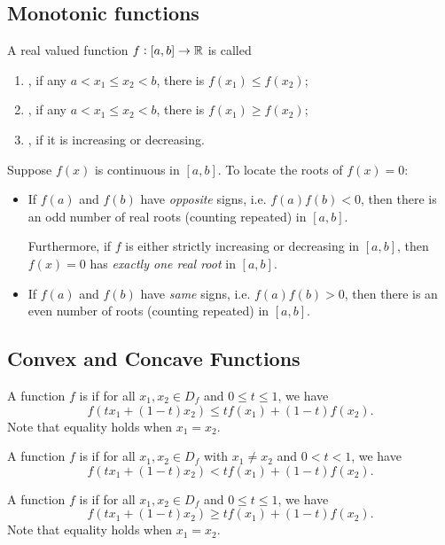 \subsection{Monotonic functions}
\begin{definition}
A real valued function $f:[a,b]\to\mathbb R$ is called
\begin{enumerate}[label=(\arabic*)]
\item {}, if any $a<x_1\le x_2<b$, there is $f(x_1)\le f(x_2)$;
\item {}, if any $a<x_1\le x_2<b$, there is $f(x_1)\ge f(x_2)$;
\item {}, if it is increasing or decreasing.
\end{enumerate}
\end{definition}

Suppose $f(x)$ is continuous in $[a,b]$. To locate the roots of $f(x)=0$:
\begin{itemize}
\item If $f(a)$ and $f(b)$ have \emph{opposite} signs, i.e. $f(a)f(b)<0$, then there is an odd number of real roots (counting repeated) in $[a,b]$.

Furthermore, if $f$ is either strictly increasing or decreasing in $[a,b]$, then $f(x)=0$ has \emph{exactly one real root} in $[a,b]$.

\item If $f(a)$ and $f(b)$ have \emph{same} signs, i.e. $f(a)f(b)>0$, then there is an even number of roots (counting repeated) in $[a,b]$.
\end{itemize}

\subsection{Convex and Concave Functions}
\begin{definition}
A function $f$ is  if for all $x_1,x_2\in D_f$ and $0\le t\le 1$, we have
\[ f(tx_1+(1-t)x_2)\le tf(x_1)+(1-t)f(x_2). \]
Note that equality holds when $x_1=x_2$.
\end{definition}

\begin{definition}
A function $f$ is  if for all $x_1,x_2\in D_f$ with $x_1\neq x_2$ and $0<t<1$, we have
\[ f(tx_1+(1-t)x_2)<tf(x_1)+(1-t)f(x_2). \]
\end{definition}

\begin{definition}
A function $f$ is  if for all $x_1,x_2\in D_f$ and $0\le t\le 1$, we have
\[ f(tx_1+(1-t)x_2)\ge tf(x_1)+(1-t)f(x_2). \]
Note that equality holds when $x_1=x_2$.
\end{definition}

